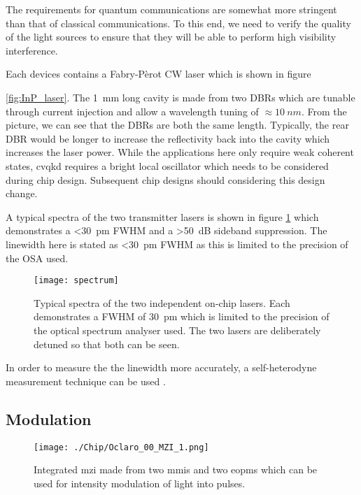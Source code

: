 The requirements for quantum communications are somewhat more stringent than that of classical communications. To this end, we need to verify the quality of the light sources to ensure that they will be able to perform high visibility interference. 

Each devices contains a Fabry-P\`{e}rot \acl{CW} laser which is shown in figure{\ref{fig:InP_laser}. The \SI{1}{mm} long cavity is made from two \acp{DBR} which are tunable through current injection and allow a wavelength tuning of $\approx \SI{10}{nm}$. From the picture, we can see that the \acp{DBR} are both the same length. Typically, the rear \ac{DBR} would be longer to increase the reflectivity back into the cavity which increases the laser power. While the applications here only require weak coherent states, \ac{cvqkd} requires a bright local oscillator which needs to be considered during chip design. Subsequent chip designs should considering this design change.

A typical spectra of the two transmitter lasers is shown in figure \ref{fig:spectra} which demonstrates a \SI{<30}{pm} \ac{FWHM} and a \SI{>50}{dB} sideband suppression. The linewidth here is stated as \SI{<30}{pm} \ac{FWHM} as this is limited to the precision of the \ac{OSA} used. 

\begin{figure}[tbp]
	\centering
	\texttt{[image: spectrum]}
	\caption[Laser spectrum]{Typical spectra of the two independent on-chip lasers. Each demonstrates a \ac{FWHM} of \SI{30}{pm} which is limited to the precision of the optical spectrum analyser used. The two lasers are deliberately detuned so that both can be seen. }
	\label{fig:spectra}
\end{figure}

In order to measure the the linewidth more accurately, a self-heterodyne measurement technique can be used \cite{self-heterodyne}. 

\subsection{Modulation}

\begin{figure}[tbp]
	\texttt{[image: ./Chip/Oclaro\_00\_MZI\_1.png]}
	\caption{Integrated \acl{mzi} made from two \acsp{mmi} and two \acsp{eopm}  which can be used for intensity modulation of light into pulses.}
	\label{fig:InP_MZI}
\end{figure}

}

